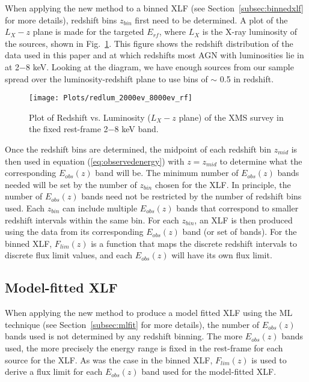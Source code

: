 \documentclass[fleqn,usenatbib]{mnras}
\begin{document}
    When applying the new method to a binned XLF (see Section~\ref{subsec:binnedxlf} for more details), redshift bins $z_{bin}$ first need to be determined. 
    A plot of the $L_{X} - z$ plane is made for the targeted $E_{rf}$, where $L_{X}$ is the X-ray luminosity of the sources, shown in Fig.~\ref{fig:redlum}.
    This figure shows the redshift distribution of the data used in this paper and at which redshifts most AGN with luminosities lie in at 2$-$8 keV.
    Looking at the diagram, we have enough sources from our sample spread over the luminosity-redshift plane to use bins of $\sim$ 0.5 in redshift.

        \begin{figure}
    	\centering
      	\texttt{[image: Plots/redlum\_2000ev\_8000ev\_rf]}
      	\caption{Plot of Redshift vs. Luminosity ($L_{X} - z$ plane) of the XMS survey in the fixed rest-frame 2$-$8 keV band.}
     	\label{fig:redlum}
    	\end{figure}
    
    Once the redshift bins are determined, the midpoint of each redshift bin $z_{mid}$ is then used in equation (\ref{eq:observedenergy}) with $z = z_{mid}$ to determine what the corresponding $E_{obs}(z)$ band will be. 
    The minimum number of $E_{obs}(z)$ bands needed will be set by the number of $z_{bin}$ chosen for the XLF. 
    In principle, the number of $E_{obs}(z)$ bands need not be restricted by the number of redshift bins used. 
    Each $z_{bin}$ can include multiple $E_{obs}(z)$ bands that correspond to smaller redshift intervals within the same bin.
    For each $z_{bin}$, an XLF is then produced using the data from its corresponding $E_{obs}(z)$ band (or set of bands). 
    For the binned XLF, $F_{lim}(z)$ is a function that maps the discrete redshift intervals to discrete flux limit values, and each $E_{obs}(z)$ will have its own flux limit.



	\subsection{Model-fitted XLF}\label{subsec:zmethodfitted}  
	
    When applying the new method to produce a model fitted XLF using the ML technique (see Section~\ref{subsec:mlfit} for more details), the number of $E_{obs}(z)$ bands used is not determined by any redshift binning.
    The more $E_{obs}(z)$ bands used, the more precisely the energy range is fixed in the rest-frame for each source for the XLF.
    As was the case in the binned XLF, $F_{lim}(z)$ is used to derive a flux limit for each $E_{obs}(z)$ band used for the model-fitted XLF. 
    
\end{document}
